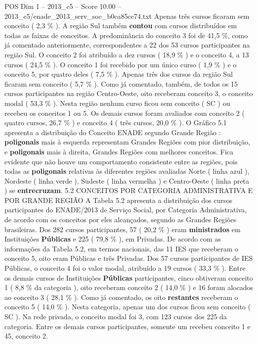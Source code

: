 \begin{textsample}{POS Dim 1 – 2013\_c5 – Score 10.00 – 2013\_c5/enade\_2013\_serv\_soc\_b0ca85ce74.txt}
Apenas três cursos ficaram sem conceito ( 2,3 \% ).
A região Sul também \textbf{contou} com cursos distribuídos em todas as faixas de conceitos.
A predominância do conceito 3 foi de 41,5 \%, como já comentado anteriormente, correspondentes a 22 dos 53 cursos participantes na região Sul.
O conceito 2 foi atribuído a dez cursos ( 18,9 \% ) e o conceito 4, a 13 cursos ( 24,5 \% ).
O conceito 1 foi recebido por um único curso ( 1,9 \% ) e o conceito 5, por quatro deles ( 7,5 \% ).
Apenas três dos cursos da região Sul ficaram sem conceito ( 5,7 \% ).
Como já comentado, também, de todos os 15 cursos participantes na região Centro-Oeste, oito receberam conceito 3, o conceito modal ( 53,3 \% ).
Nesta região nenhum curso ficou sem conceito ( SC ) ou recebeu os conceitos 1 ou 5.
Os demais cursos foram avaliados com conceito 2 ( quatro cursos, 26,7 \% ) e conceito 4 ( três cursos, 20,0 \% ).
O Gráfico 5.1 apresenta a distribuição do Conceito ENADE segundo Grande Região : \textbf{poligonais} mais à esquerda representam Grandes Regiões com pior distribuição, e \textbf{poligonais} mais à direita, Grandes Regiões com melhores conceitos.
Fica evidente que não houve um comportamento consistente entre as regiões, pois todas as \textbf{poligonais} relativas às diferentes regiões avaliadas Norte ( linha azul ), Nordeste ( linha verde ), Sudeste ( linha vermelha ) e Centro-Oeste ( linha preta ) se \textbf{entrecruzam}. 5.2 CONCEITOS POR CATEGORIA ADMINISTRATIVA E POR GRANDE REGIÃO A Tabela 5.2 apresenta a distribuição dos cursos participantes do ENADE/2013 de Serviço Social, por Categoria Administrativa, de acordo com os conceitos por eles alcançados, segundo as Grandes Regiões brasileiras.
Dos 282 cursos participantes, 57 ( 20,2 \% ) eram \textbf{ministrados} em Instituições \textbf{Públicas} e 225 ( 79,8 \% ), em Privadas.
De acordo com as informações da Tabela 5.2, em termos nacionais, das 11 IES que receberam o conceito 5, oito eram Públicas e três Privadas.
Dos 57 cursos participantes de IES Públicas, o conceito 4 foi o valor modal, atribuído a 19 cursos ( 33,3 \% ).
Entre os demais cursos de Instituições \textbf{Públicas} participantes, cinco obtiveram conceito 1 ( 8,8 \% da categoria ), oito receberam conceito 2 ( 14,0 \% ) e 16 foram alocados ao conceito 3 ( 28,1 \% ).
Como já comentado, os oito \textbf{restantes} receberam o conceito 5 ( 14,0 \% ).
Nesta categoria, apenas um dos cursos ficou sem conceito ( SC ).
Na rede privada, o conceito modal foi 3, com 123 cursos dos 225 da categoria.
Entre os demais cursos participantes, somente um recebeu conceito 1 e 45, conceito 2.

\end{textsample}
